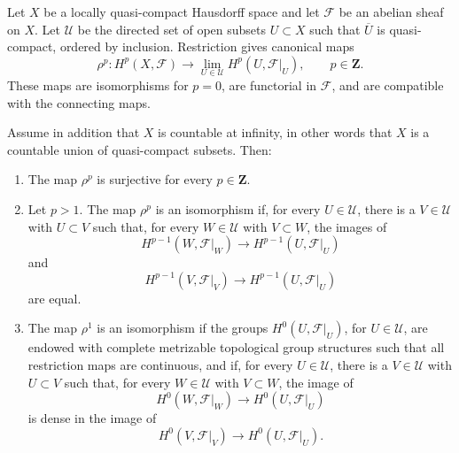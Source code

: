 \begin{lemma}
\label{lemma-cohomology-limit-relatively-compact-opens}
\begin{reference}
\cite[Chapter III, \S 3.10, (3.10.2) and Proposition 3.10.2,
pp. 182--183]{Tohoku}
\end{reference}
Let $X$ be a locally quasi-compact Hausdorff space and let
$\mathcal{F}$ be an abelian sheaf on $X$. Let $\mathcal{U}$ be the
directed set of open subsets $U\subset X$ such that $\overline{U}$ is
quasi-compact, ordered by inclusion. Restriction gives canonical maps
$$
\rho^p :
H^p(X,\mathcal{F})\longrightarrow
\lim_{U\in\mathcal{U}}H^p(U,\mathcal{F}|_U),
\qquad p\in\mathbf{Z}.
$$
These maps are isomorphisms for $p=0$, are functorial in $\mathcal{F}$,
and are compatible with the connecting maps.

Assume in addition that $X$ is countable at infinity, in other words that
$X$ is a countable union of quasi-compact subsets. Then:
\begin{enumerate}
\item The map $\rho^p$ is surjective for every $p\in\mathbf{Z}$.
\item Let $p>1$. The map $\rho^p$ is an isomorphism if, for every
$U\in\mathcal{U}$, there is a $V\in\mathcal{U}$ with $U\subset V$ such
that, for every $W\in\mathcal{U}$ with $V\subset W$, the images of
$$
H^{p-1}(W,\mathcal{F}|_W)\longrightarrow H^{p-1}(U,\mathcal{F}|_U)
$$
and
$$
H^{p-1}(V,\mathcal{F}|_V)\longrightarrow H^{p-1}(U,\mathcal{F}|_U)
$$
are equal.
\item The map $\rho^1$ is an isomorphism if the groups
$H^0(U,\mathcal{F}|_U)$, for $U\in\mathcal{U}$, are endowed with
complete metrizable topological group structures such that all
restriction maps are continuous, and if, for every $U\in\mathcal{U}$,
there is a $V\in\mathcal{U}$ with $U\subset V$ such that, for every
$W\in\mathcal{U}$ with $V\subset W$, the image of
$$
H^0(W,\mathcal{F}|_W)\longrightarrow H^0(U,\mathcal{F}|_U)
$$
is dense in the image of
$$
H^0(V,\mathcal{F}|_V)\longrightarrow H^0(U,\mathcal{F}|_U).
$$
\end{enumerate}
\end{lemma}

